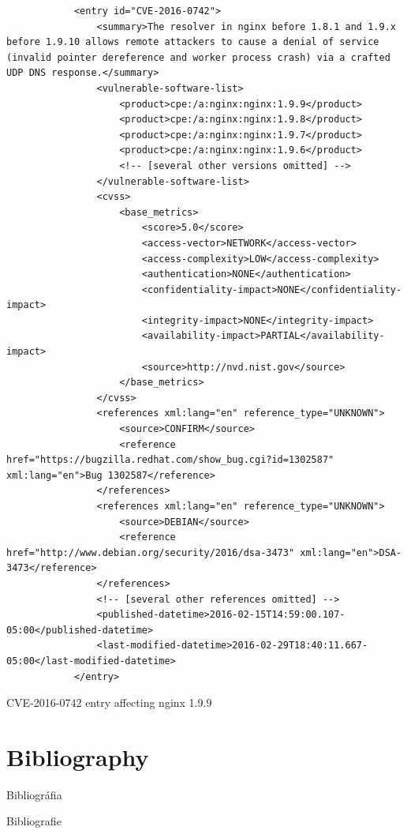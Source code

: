 \documentclass[a4paper,12pt]{article}
\newcommand\sectionhu[1]{\addcontentsline{toc.hu}{section} {\protect\numberline{\thesection} #1}}
\newcommand\sectionro[1]{\addcontentsline{toc.ro}{section} {\protect\numberline{\thesection} #1}}
\begin{document}
	\begin{listing}[H]
		\begin{verbatim}
			<entry id="CVE-2016-0742">
				<summary>The resolver in nginx before 1.8.1 and 1.9.x before 1.9.10 allows remote attackers to cause a denial of service (invalid pointer dereference and worker process crash) via a crafted UDP DNS response.</summary>
				<vulnerable-software-list>
					<product>cpe:/a:nginx:nginx:1.9.9</product>
					<product>cpe:/a:nginx:nginx:1.9.8</product>
					<product>cpe:/a:nginx:nginx:1.9.7</product>
					<product>cpe:/a:nginx:nginx:1.9.6</product>
					<!-- [several other versions omitted] -->
				</vulnerable-software-list>
				<cvss>
					<base_metrics>
						<score>5.0</score>
						<access-vector>NETWORK</access-vector>
						<access-complexity>LOW</access-complexity>
						<authentication>NONE</authentication>
						<confidentiality-impact>NONE</confidentiality-impact>
						<integrity-impact>NONE</integrity-impact>
						<availability-impact>PARTIAL</availability-impact>
						<source>http://nvd.nist.gov</source>
					</base_metrics>
				</cvss>
				<references xml:lang="en" reference_type="UNKNOWN">
					<source>CONFIRM</source>
					<reference href="https://bugzilla.redhat.com/show_bug.cgi?id=1302587" xml:lang="en">Bug 1302587</reference>
				</references>
				<references xml:lang="en" reference_type="UNKNOWN">
					<source>DEBIAN</source>
					<reference href="http://www.debian.org/security/2016/dsa-3473" xml:lang="en">DSA-3473</reference>
				</references>
				<!-- [several other references omitted] -->
				<published-datetime>2016-02-15T14:59:00.107-05:00</published-datetime>
				<last-modified-datetime>2016-02-29T18:40:11.667-05:00</last-modified-datetime>
			</entry>
		\end{verbatim}
		\caption{CVE-2016-0742 entry affecting nginx 1.9.9}
		\label{nginxcve}
	\end{listing}

\newpage
\section{Bibliography}
\sectionhu{Bibliográfia} \sectionro{Bibliografie}

	\begingroup
	\renewcommand{\section}[2]{}
	\renewcommand{\markboth}[2]{}
		
		
	\endgroup
\end{document}
